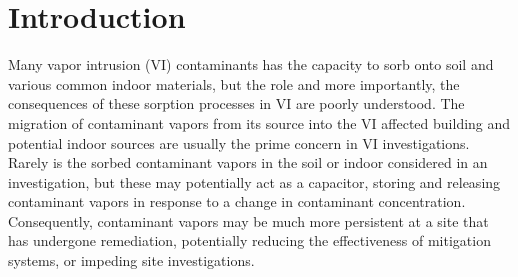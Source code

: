 \begin{comment}

What is the message of the paper?

Sorbed contaminants can significantly delay changes in concentration in the indoor air and the soil-gas depending on the particular soil and/or indoor materials found.
This has consequences if one is for instance interested in mitigating or remediating a VI site as sorption may significantly impede this effort.
It also has consequences for rooting out indoor contaminant sources as:
1. Even after ventilation and/or removing potential indoor sources, there may still be contaminant vapors being released from various materials.
2. It may decrease the effectiveness of applying the CPM.

What is the new result/contribution that you want to describe?

This study presents some new sorption information for TCE and runs never-done-before simulations that investigate the potential role of sorption in VI and VI investigations.

What do you want to convince people of?

1. Take indoor materials into account and perhaps removing or covering up exposed materials that have a high sorption capacity.
2. Take it into consideration that contaminants vapors may emanate from soils for a long time, since they potentially have such a large sorption capacity - almost acting a source in of themselves. E.g. that remediation or mitigation effort may be impeded by this.
3. Perhaps desorbing soil/indoor material samples to determine how significant sorption might be warranted.

\end{comment}

\section{Introduction}\label{sec:intro}

Many vapor intrusion (VI) contaminants has the capacity to sorb onto soil and various common indoor materials, but the role and more importantly, the consequences of these sorption processes in VI are poorly understood\cite{meininghaus_diffusion_2000,meininghaus_diffusion_2002,tillman_review_2005}.
The migration of contaminant vapors from its source into the VI affected building and potential indoor sources are usually the prime concern in VI investigations.
Rarely is the sorbed contaminant vapors in the soil or indoor considered in an investigation, but these may potentially act as a capacitor, storing and releasing contaminant vapors in response to a change in contaminant concentration.
Consequently, contaminant vapors may be much more persistent at a site that has undergone remediation, potentially reducing the effectiveness of mitigation systems, or impeding site investigations.\par

